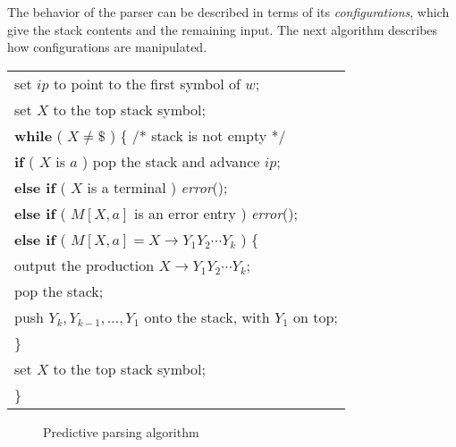 \documentclass[a4paper,twoside]{book}
\begin{document}
The behavior of the parser can be described in terms of its \textit{configurations}, which give the stack contents and the remaining input. The next algorithm describes how configurations are manipulated.


\begin{center}
    \begin{tabular}{l}
        set $ip$ to point to the first symbol of $w$;\\
        set $X$ to the top stack symbol;\\
        \textbf{while} ( $X\ne\mathdollar$ ) \{ /* stack is not empty */\\
        \qquad\textbf{if} ( $X$ is $a$ ) pop the stack and advance $ip$;\\
        \qquad\textbf{else if} ( $X$ is a terminal ) \textit{error}();\\
        \qquad\textbf{else if} ( $M[X,a]$ is an error entry ) \textit{error}();\\
        \qquad\textbf{else if} ( $M[X,a]=X\rightarrow Y_1Y_2\cdots Y_k$ ) \{\\
        \qquad\qquad output the production $X\rightarrow Y_1Y_2\cdots Y_k$;\\
        \qquad\qquad pop the stack;\\
        \qquad\qquad push $Y_k,Y_{k-1},\ldots,Y_1$ onto the stack, with $Y_1$ on top;\\
        \qquad \}\\
        \qquad set $X$ to the top stack symbol;\\
        \}
    \end{tabular}
\end{center}
\begin{figure}[htbp]
    \caption{Predictive parsing algorithm}
    \label{Figure:4.20}
\end{figure}
\end{document}
